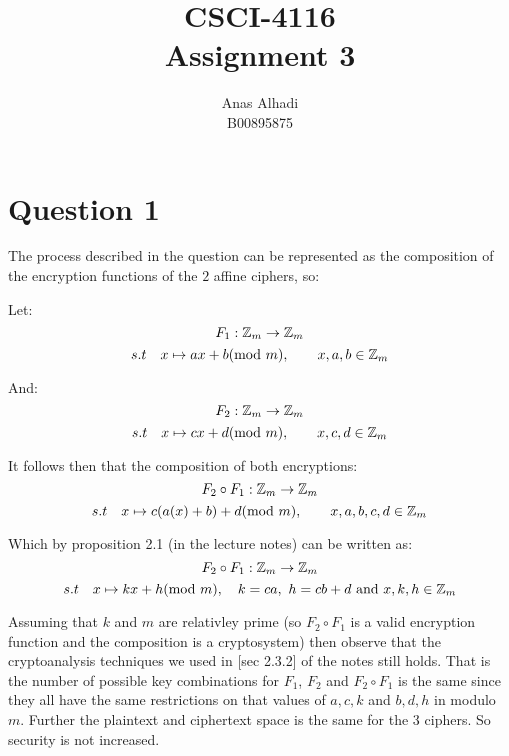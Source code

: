 \documentclass{article}
\title{\textbf{CSCI-4116\\Assignment 3}}
\author{Anas Alhadi\\B00895875}
\numberwithin{equation}{subsection}
\begin{document}
	\maketitle

	

	\vspace{25pt}
	\section*{Question 1}
	The process described in the question can be represented as the composition of 
	the encryption functions of the $2$ affine ciphers, so:

	Let:
	\begin{equation}\notag
		F_1: \mathbb{Z}_m	\rightarrow \mathbb{Z}_m
	\end{equation}
	\begin{equation}\notag
		s.t \quad x \mapsto ax + b (\textrm{mod}\ m), \qquad x,a,b\in \mathbb{Z}_m	
	\end{equation}

	And:
	\begin{equation}\notag
		F_2: \mathbb{Z}_m	\rightarrow \mathbb{Z}_m
	\end{equation}
	\begin{equation}\notag
		s.t \quad x \mapsto cx + d (\textrm{mod}\ m), \qquad x,c,d\in \mathbb{Z}_m	
	\end{equation}

	It follows then that the composition of both encryptions:
	\begin{equation}\notag
		F_2 \circ	F_1	: \mathbb{Z}_m \rightarrow \mathbb{Z}_m
	\end{equation}
	\begin{equation}\notag
		s.t \quad x \mapsto c(a(x)+b) + d (\textrm{mod}\ m), \qquad x,a,b,c,d\in \mathbb{Z}_m	
	\end{equation}

	Which by proposition 2.1 (in the lecture notes) can be written as:
	\begin{equation}\notag
		F_2 \circ	F_1	: \mathbb{Z}_m \rightarrow \mathbb{Z}_m
	\end{equation}
	\begin{equation}\notag
		s.t \quad x \mapsto kx + h(\textrm{mod}\ m), \quad k = ca,\ h = cb+d \ \textrm{and}\ x,k,h \in \mathbb{Z}_m	
	\end{equation}

	\vspace{10pt}
	Assuming that $k$ and $m$ are relativley prime (so $F_2 \circ F_1$ is a valid encryption function and 
	the composition is a cryptosystem) then observe that the cryptoanalysis techniques we used in [sec 2.3.2] of
	the notes still holds. That is the number of possible key combinations for $F_1$, $F_2$ and $F_2 \circ F_1$ is the
	same since they all have the same restrictions on that values of $a,c,k$ and $b,d,h$ in modulo $m$. Further
	the plaintext and ciphertext space is the same for the 3 ciphers. So security is not increased.
\end{document}
